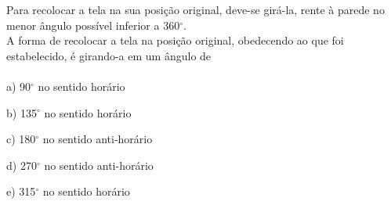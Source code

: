 \documentclass[a4paper,14pt]{article}
\begin{document}
\begin{multicols}{2}
\begin{enumerate}
        	Para recolocar a tela na sua posição original, deve-se girá-la, rente à parede no menor ângulo possível inferior a 360$^\circ$. \\
        	A forma de recolocar a tela na posição original, obedecendo ao que foi estabelecido, é girando-a em um ângulo de 
        	\\\\
        	a) 90$^\circ$ no sentido horário 
        	
        	b) 135$^\circ$ no sentido horário 
        	
        	c) 180$^\circ$ no sentido anti-horário 
        	
        	d) 270$^\circ$ no sentido anti-horário 
        	
        	e) 315$^\circ$ no sentido horário
        	

\end{enumerate}
\end{multicols}
\end{document}
